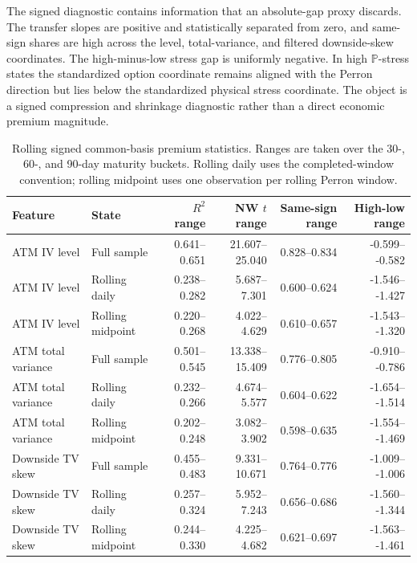 \documentclass[11pt,a4paper]{amsart}
\theoremstyle{plain}
\theoremstyle{definition}
\theoremstyle{remark}
\newcommand{\PP}{\mathbb{P}}
\begin{document}
The signed diagnostic contains information that an absolute-gap proxy discards.  The transfer
slopes are positive and statistically separated from zero, and same-sign shares are high across the
level, total-variance, and filtered downside-skew coordinates.  The high-minus-low stress gap is
uniformly negative.  In high \(\PP\)-stress states the standardized option coordinate remains aligned
with the Perron direction but lies below the standardized physical stress coordinate.  The object is
a signed compression and shrinkage diagnostic rather than a direct economic premium magnitude.

\begin{table}[t]
\centering
\footnotesize
\begin{tabular}{llrrrr}
\hline
Feature & State & \(R^2\) range & NW \(t\) range & Same-sign range & High-low range \\
\hline
ATM IV level & Full sample & 0.641--0.651 & 21.607--25.040 & 0.828--0.834 & -0.599-- -0.582 \\
ATM IV level & Rolling daily & 0.238--0.282 & 5.687--7.301 & 0.600--0.624 & -1.546-- -1.427 \\
ATM IV level & Rolling midpoint & 0.220--0.268 & 4.022--4.629 & 0.610--0.657 & -1.543-- -1.320 \\
ATM total variance & Full sample & 0.501--0.545 & 13.338--15.409 & 0.776--0.805 & -0.910-- -0.786 \\
ATM total variance & Rolling daily & 0.232--0.266 & 4.674--5.577 & 0.604--0.622 & -1.654-- -1.514 \\
ATM total variance & Rolling midpoint & 0.202--0.248 & 3.082--3.902 & 0.598--0.635 & -1.554-- -1.469 \\
Downside TV skew & Full sample & 0.455--0.483 & 9.331--10.671 & 0.764--0.776 & -1.009-- -1.006 \\
Downside TV skew & Rolling daily & 0.257--0.324 & 5.952--7.243 & 0.656--0.686 & -1.560-- -1.344 \\
Downside TV skew & Rolling midpoint & 0.244--0.330 & 4.225--4.682 & 0.621--0.697 & -1.563-- -1.461 \\
\hline
\end{tabular}
\caption{Rolling signed common-basis premium statistics.  Ranges are taken
over the 30-, 60-, and 90-day maturity buckets.  Rolling daily uses the completed-window
convention; rolling midpoint uses one observation per rolling Perron window.}
\label{tab:empirical-premium-rolling}
\end{table}
\end{document}
